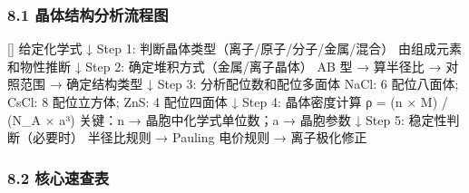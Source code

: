 \documentclass[a4paper,11pt]{ctexart}
\newenvironment{Shaded}{}{}
\newenvironment{Highlighting}{}{}
\newcommand{\NormalTok}[1]{#1}
\newcommand{\箭}{\ensuremath{\rightarrow}}
\newcommand{\左箭}{\ensuremath{\leftarrow}}
\newcommand{\上箭}{\ensuremath{\uparrow}}
\newcommand{\下箭}{\ensuremath{\downarrow}}
\newcommand{\衡}{\ensuremath{\rightleftharpoons}}
\newcommand{\双箭}{\ensuremath{\leftrightarrow}}
\newcommand{\约等于}{\ensuremath{\approx}}
\newcommand{\小于等于}{\ensuremath{\leq}}
\newcommand{\大于等于}{\ensuremath{\geq}}
\newcommand{\不等于}{\ensuremath{\neq}}
\newcommand{\西格马}{\ensuremath{\sigma}}
\newcommand{\派}{\ensuremath{\pi}}
\begin{document}
\subsubsection{8.1 晶体结构分析流程图}\label{ux6676ux4f53ux7ed3ux6784ux5206ux6790ux6d41ux7a0bux56fe}

\begin{Shaded}
\begin{Highlighting}[]
\NormalTok{给定化学式}
\NormalTok{   ↓}
\NormalTok{Step 1: 判断晶体类型（离子/原子/分子/金属/混合）}
\NormalTok{   由组成元素和物性推断}
\NormalTok{   ↓}
\NormalTok{Step 2: 确定堆积方式（金属/离子晶体）}
\NormalTok{   AB 型 → 算半径比 → 对照范围 → 确定结构类型}
\NormalTok{   ↓}
\NormalTok{Step 3: 分析配位数和配位多面体}
\NormalTok{   NaCl: 6 配位八面体; CsCl: 8 配位立方体; ZnS: 4 配位四面体}
\NormalTok{   ↓}
\NormalTok{Step 4: 晶体密度计算}
\NormalTok{   ρ = (n × M) / (N\_A × a³)}
\NormalTok{   关键：n → 晶胞中化学式单位数；a → 晶胞参数}
\NormalTok{   ↓}
\NormalTok{Step 5: 稳定性判断（必要时）}
\NormalTok{   半径比规则 → Pauling 电价规则 → 离子极化修正}
\end{Highlighting}
\end{Shaded}

\subsubsection{8.2 核心速查表}\label{ux6838ux5fc3ux901fux67e5ux8868}
\end{document}
